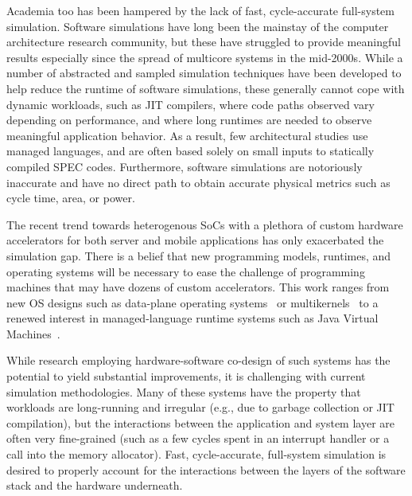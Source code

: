 Academia too has been hampered by the lack of fast, cycle-accurate full-system
simulation.  Software simulations have long been the mainstay of the computer
architecture research community, but these have struggled to provide meaningful
results especially since the spread of multicore systems in the mid-2000s.
While a number of abstracted and sampled simulation techniques have been
developed to help reduce the runtime of software simulations, these generally
cannot cope with dynamic workloads, such as JIT compilers, where code paths
observed vary depending on performance, and where long runtimes are needed to
observe meaningful application behavior.  As a result, few architectural
studies use managed languages, and are often based solely on small inputs to
statically compiled SPEC codes.  Furthermore, software simulations are
notoriously inaccurate and have no direct path to obtain accurate physical
metrics such as cycle time, area, or power.

The recent trend towards heterogenous SoCs with a plethora of custom hardware
accelerators for both server and mobile applications has only exacerbated the
simulation gap. There is a belief that new programming models, runtimes, and
operating systems will be necessary to ease the challenge of programming
machines that may have dozens of custom accelerators. This work ranges from new
OS designs such as data-plane operating systems~\cite{arrakis} or
multikernels~\cite{barrelfish} to a renewed interest in managed-language
runtime systems such as Java Virtual Machines~\cite{broom,taurus}.

While research employing hardware-software co-design of such systems has the
potential to yield substantial improvements, it is challenging with current
simulation methodologies.  Many of these systems have the property that
workloads are long-running and irregular (e.g., due to garbage collection or
JIT compilation), but the interactions between the application and system layer
are often very fine-grained (such as a few cycles spent in an interrupt handler
or a call into the memory allocator).  Fast, cycle-accurate, full-system
simulation is desired to properly account for the interactions between the
layers of the software stack and the hardware underneath.

